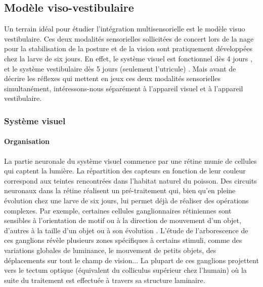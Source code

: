


\subsection{Modèle viso-vestibulaire}

Un terrain idéal pour étudier l'intégration multisensorielle est le modèle visuo vestibulaire. Ces deux modalités sensorielles sollicitées de concert lors de la nage pour la stabilisation de la posture et de la vision sont pratiquement développées chez la larve de six jours. En effet, le système visuel est fonctionnel dès 4 jours \cite{bollmann_zebrafish_2019}, et le système vestibulaire dès 5 jours (seulement l'utricule) \cite{haddon_early_1996}. Mais avant de décrire les réflexes qui mettent en jeux ces deux modalités sensorielles simultanément, intéressons-nous séparément à l'appareil visuel et à l'appareil vestibulaire.

\subsubsection{Système visuel}

\paragraph{Organisation}
La partie neuronale du système visuel commence par une rétine munie de cellules qui captent la lumière. La répartition des capteurs en fonction de leur couleur correspond aux teintes rencontrées dans l'habitat naturel du poisson. Des circuits neuronaux dans la rétine réalisent un pré-traitement qui, bien qu'en pleine évolution chez une larve de six jours, lui permet déjà de réaliser des opérations complexes. Par exemple, certaines cellules ganglionnaires rétiniennes sont sensibles à l'orientation de motif ou à la direction de mouvement d'un objet, d'autres à la taille d'un objet ou à son évolution \cite{bollmann_zebrafish_2019}. L'étude de l'arborescence de ces ganglions révèle plusieurs zones spécifiques à certains stimuli, comme des variations globales de luminance, le mouvement de petits objets, des déplacements sur tout le champ de vision... La plupart de ces ganglions projettent vers le tectum optique (équivalent du colliculus supérieur chez l'humain) où la suite du traitement est effectuée à travers sa structure laminaire.

